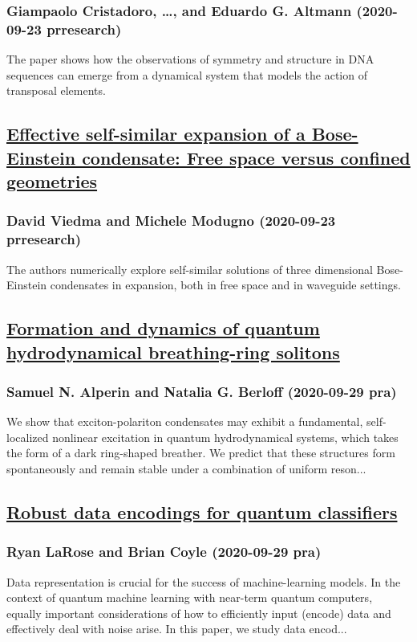 \subsubsection*{Giampaolo Cristadoro, \dots, and Eduardo G. Altmann (2020-09-23 prresearch)}
The paper shows how the observations of symmetry and structure in DNA sequences can emerge from a dynamical system that models the action of transposal elements.
\subsection*{\href{http://link.aps.org/doi/10.1103/PhysRevResearch.2.033478}{Effective self-similar expansion of a Bose-Einstein condensate: Free space versus confined geometries}}
\subsubsection*{David Viedma and Michele Modugno (2020-09-23 prresearch)}
The authors numerically explore self-similar solutions of three dimensional Bose-Einstein condensates in expansion, both in free space and in waveguide settings.
\subsection*{\href{http://link.aps.org/doi/10.1103/PhysRevA.102.031304}{Formation and dynamics of quantum hydrodynamical breathing-ring solitons}}
\subsubsection*{Samuel N. Alperin and Natalia G. Berloff (2020-09-29 pra)}
We show that exciton-polariton condensates may exhibit a fundamental, self-localized nonlinear excitation in quantum hydrodynamical systems, which takes the form of a dark ring-shaped breather. We predict that these structures form spontaneously and remain stable under a combination of uniform reson...
\subsection*{\href{http://link.aps.org/doi/10.1103/PhysRevA.102.032420}{Robust data encodings for quantum classifiers}}
\subsubsection*{Ryan LaRose and Brian Coyle (2020-09-29 pra)}
Data representation is crucial for the success of machine-learning models. In the context of quantum machine learning with near-term quantum computers, equally important considerations of how to efficiently input (encode) data and effectively deal with noise arise. In this paper, we study data encod...
